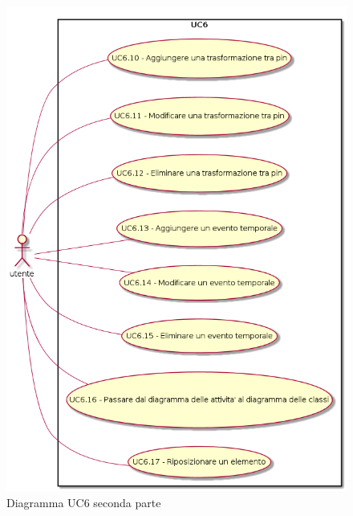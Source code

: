 \documentclass[../AnalisiDeiRequisiti.tex]{subfiles}
\begin{document}
			\begin{figure} [H]
				\centering
				\includegraphics[scale=0.45]{./Figures/UC6parte2.png}
				\caption{Diagramma UC6 seconda parte}\label{}
			\end{figure}
\end{document}

